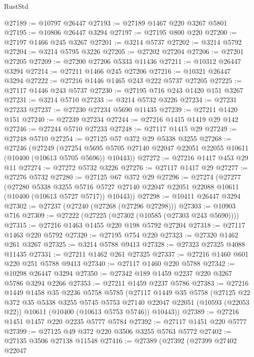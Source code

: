 \begin{lexlean}{RustStd}
\begin{coremodule}
@27189 := @10797 @26447
@27193 := @27189 @1467 @220 @3267 @5801
@27195 := @10806 @26447 @3294
@27197 := @27195 @800 @220
@27200 := @27197 @1466 @245 @3267
@27201 := @3214 @5737
@27202 := @3214 @5792
@27204 := @3214 @5795 @3226
@27205 := @27202 @27204
@27206 := @27201 @27205
@27209 := @27200 @27206 @5333 @11436
@27211 := @10312 @26447 @3294
@27214 := @27211 @1466 @245 @27206
@27216 := @10321 @26447 @3294
@27222 := @27216 @1446 @1465 @243 @222 @5737 @27205
@27225 := @27117 @1446 @243 @5737
@27230 := @27195 @716 @243 @1420 @151 @3267
@27231 := @3214 @5710
@27233 := @3214 @5732 @3226
@27234 := @27231 @27233
@27237 := @27230 @27234 @5690 @11435
@27239 := @27211 @1420 @151
@27240 := @27239 @27234
@27244 := @27216 @1415 @1419 @29 @142
@27246 := @27244 @5710 @27233
@27248 := @27117 @1415 @29
@27249 := @27248 @5710
@27254 := @27125 @57 @372 @29 @5338 @3255
@27268 := @27246
    (@27249
      (@27254 @5695 @5705 @27140 @22047 @22051 @22055 @10611 (@10400 (@10613 @5705 @5696)) @10443))
@27272 := @27216 @1417 @453 @29 @11
@27274 := @27272 @5732 @3226
@27276 := @27117 @1417 @29
@27277 := @27276 @5732
@27280 := @27125 @67 @372 @29
@27296 := @27274
    (@27277
      (@27280
        @5338
        @3255
        @5716
        @5727
        @27140
        @22047
        @22051
        @22088
        @10611
        (@10400 (@10613 @5727 @5717))
        @10443))
@27298 := @10411 @26447 @3294
@27302 := @27237 (@27240 (@27268 (@27296 @27298)))
@27303 := @10903 @716
@27309 := @27222 (@27225 (@27302 (@10585 (@27303 @243 @5690))))
@27315 := @27216 @1463 @1455 @220 @198 @5792 @27204
@27318 := @27117 @1463 @220 @5792
@27320 := @27195 @754 @220
@27323 := @27320 @1462 @261 @3267
@27325 := @3214 @5788 @9413
@27328 := @27323 @27325 @4088 @11435
@27331 := @27211 @1462 @261 @27325
@27337 := @27216 @1460 @601 @220 @251 @5788 @9413
@27340 := @27117 @1460 @220 @5788
@27342 := @10298 @26447 @3294
@27350 := @27342 @189 @1459 @2237 @220 @3267 @5786 @3294 @2266
@27353 := @27211 @1459 @2237 @5786
@27383 := @27216
    @1449
    @1458
    @35
    @2236
    @5758
    @5785
    (@27117
      @1449
      @35
      @5758
      (@27125
        @22
        @372
        @35
        @5338
        @3255
        @5745
        @5753
        @27140
        @22047
        @22051
        (@10593 (@22053 @22))
        @10611
        (@10400 (@10613 @5753 @5746))
        @10443))
@27389 := @27216 @1451 @1457 @220 @2235 @5777 @5784
@27392 := @27117 @1451 @220 @5777
@27399 := @27125 @49 @372 @220 @3506 @3255 @5763 @5772
@27402 := @27135 @3506 @27138 @11548
@27416 := @27389
    (@27392
      (@27399
        @27402
        @22047

\end{coremodule}
\end{lexlean}
